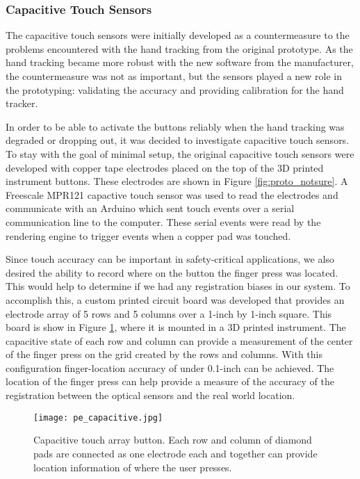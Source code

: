 \subsubsection{Capacitive Touch Sensors}

The capacitive touch sensors were initially developed as a countermeasure to the problems encountered with the hand tracking from the original prototype.
As the hand tracking became more robust with the new software from the manufacturer, the countermeasure was not as important, but the sensors played a new role in the prototyping: validating the accuracy and providing calibration for the hand tracker.

In order to be able to activate the buttons reliably when the hand tracking was degraded or dropping out, it was decided to investigate capacitive touch sensors.
To stay with the goal of minimal setup, the original capacitive touch sensors were developed with copper tape electrodes placed on the top of the 3D printed instrument buttons.
These electrodes are shown in Figure \ref{fig:proto_notsure}.
A Freescale MPR121 capactive touch sensor was used to read the electrodes and communicate with an Arduino which sent touch events over a serial communication line to the computer.
These serial events were read by the rendering engine to trigger events when a copper pad was touched.

Since touch accuracy can be important in safety-critical applications, we also desired the ability to record where on the button the finger press was located.
This would help to determine if we had any registration biases in our system.
To accomplish this, a custom printed circuit board was developed that provides an electrode array of 5 rows and 5 columns over a 1-inch by 1-inch square.
This board is show in Figure \ref{fig:pe_capacitive}, where it is mounted in a 3D printed instrument.
The capacitive state of each row and column can provide a measurement of the center of the finger press on the grid created by the rows and columns.
With this configuration finger-location accuracy of under 0.1-inch can be achieved.
The location of the finger press can help provide a measure of the accuracy of the registration between the optical sensors and the real world location.

\begin{figure}
    \centering
    \texttt{[image: pe\_capacitive.jpg]}
    \caption{Capacitive touch array button. Each row and column of diamond pads are connected as one electrode each and together can provide location information of where the user presses.}
    \label{fig:pe_capacitive}
\end{figure}


